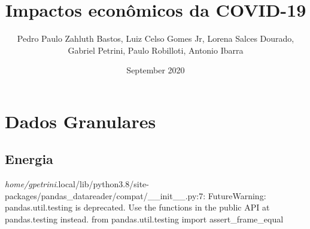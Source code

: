 \documentclass[11pt]{article}
\author{Pedro Paulo Zahluth Bastos, Luiz Celso Gomes Jr, Lorena Salces Dourado, Gabriel Petrini, Paulo Robilloti, Antonio Ibarra}
\date{September 2020}
\title{Impactos econômicos da COVID-19}
\begin{document}
\maketitle
\tableofcontents


\section{Dados Granulares}
\label{sec:org8501ce0}

\subsection{Energia}
\label{sec:org6aa200b}

\emph{home/gpetrini}.local/lib/python3.8/site-packages/pandas\_datareader/compat/\_\_init\_\_.py:7: FutureWarning: pandas.util.testing is deprecated. Use the functions in the public API at pandas.testing instead.
  from pandas.util.testing import assert\_frame\_equal
\end{document}
